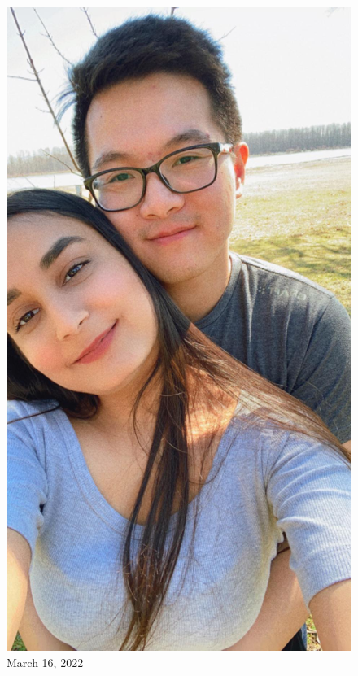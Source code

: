 \documentclass[
]{book}
\begin{document}
\begin{figure}
\centering
\includegraphics[width=5.20833in,height=\textheight]{mimages/17 3-16-2022.jpg}
\caption{March 16, 2022}
\end{figure}
\end{document}
